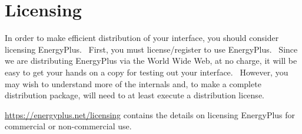 \chapter{Licensing}\label{licensing}

In order to make efficient distribution of your interface, you should consider licensing EnergyPlus.~ First, you must license/register to use EnergyPlus.~ Since we are distributing EnergyPlus via the World Wide Web, at no charge, it will be easy to get your hands on a copy for testing out your interface.~ However, you may wish to understand more of the internals and, to make a complete distribution package, will need to at least execute a distribution license.

\url{https://energyplus.net/licensing} contains the details on licensing EnergyPlus for commercial or non-commercial use.
